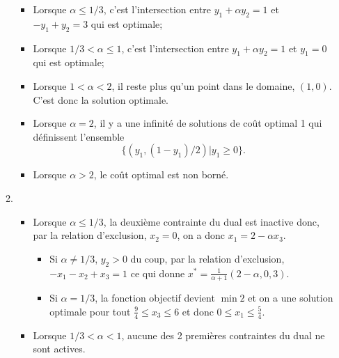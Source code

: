 \begin{enumerate}
\begin{solution}
\begin{enumerate}
\begin{center}
          \end{center}
          \begin{itemize}
            \item Lorsque $\alpha \leq 1/3$, c'est l'intersection entre
              $y_1 + \alpha y_2 = 1$ et $-y_1 + y_2 = 3$  qui est optimale;
            \item Lorsque $1/3 < \alpha \leq 1$, c'est l'intersection entre
              $y_1 + \alpha y_2 = 1$ et $y_1 = 0$  qui est optimale;
            \item Lorsque $1 < \alpha < 2$, il reste plus qu'un point dans le
              domaine, $(1,0)$. C'est donc la solution optimale.
            \item Lorsque $\alpha = 2$, il y a une infinité de solutions
              de coût optimal 1 qui définissent l'ensemble
              \[ \{(y_1,(1-y_1)/2) | y_1 \geq 0\}. \]
            \item Lorsque $\alpha > 2$, le coût optimal est non borné.
          \end{itemize}
        \item
          \begin{itemize}
            \item Lorsque $\alpha \leq 1/3$, la deuxième contrainte
              du dual est inactive donc,
              par la relation d'exclusion, $x_2 = 0$, on a donc
              $x_1 = 2 - \alpha x_3$.
              \begin{itemize}
                \item Si $\alpha \neq 1/3$, $y_2 > 0$ du coup,
                  par la relation d'exclusion, $-x_1 -x_2+ x_3 = 1$ ce qui
                  donne $x^* = \frac{1}{\alpha+1}(2-\alpha,0, 3)$.
                \item Si $\alpha = 1/3$, la fonction objectif devient
                  $\min 2$ et on a une solution optimale pour tout
                  $\frac{9}{4} \leq x_3 \leq 6$ et donc
                  $0 \leq x_1 \leq \frac{5}{4}$.
              \end{itemize}
            \item Lorsque $1/3 < \alpha < 1$,
              aucune des 2 premières contraintes du dual ne sont actives.

\end{itemize}
\end{enumerate}
\end{solution}
\end{enumerate}
